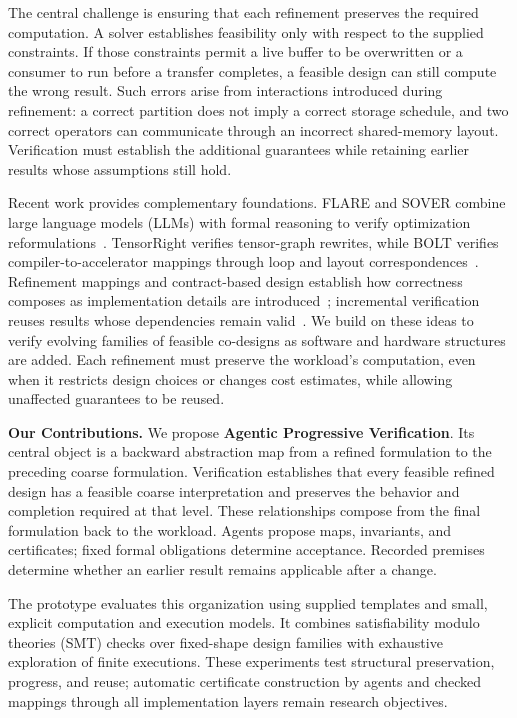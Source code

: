 \documentclass[11pt]{article}
\begin{document}
The central challenge is ensuring that each refinement preserves the required computation. A solver establishes feasibility only with respect to the supplied constraints. If those constraints permit a live buffer to be overwritten or a consumer to run before a transfer completes, a feasible design can still compute the wrong result. Such errors arise from interactions introduced during refinement: a correct partition does not imply a correct storage schedule, and two correct operators can communicate through an incorrect shared-memory layout. Verification must establish the additional guarantees while retaining earlier results whose assumptions still hold.

Recent work provides complementary foundations. FLARE and SOVER combine large language models (LLMs) with formal reasoning to verify optimization reformulations~\cite{flare,sover}. TensorRight verifies tensor-graph rewrites, while BOLT verifies compiler-to-accelerator mappings through loop and layout correspondences~\cite{tensorright,bolt}. Refinement mappings and contract-based design establish how correctness composes as implementation details are introduced~\cite{refinementmaps,contracts}; incremental verification reuses results whose dependencies remain valid~\cite{incremental}. We build on these ideas to verify evolving families of feasible co-designs as software and hardware structures are added. Each refinement must preserve the workload's computation, even when it restricts design choices or changes cost estimates, while allowing unaffected guarantees to be reused.

\textbf{Our Contributions.} We propose \textbf{Agentic Progressive Verification}. Its central object is a backward abstraction map from a refined formulation to the preceding coarse formulation. Verification establishes that every feasible refined design has a feasible coarse interpretation and preserves the behavior and completion required at that level. These relationships compose from the final formulation back to the workload. Agents propose maps, invariants, and certificates; fixed formal obligations determine acceptance. Recorded premises determine whether an earlier result remains applicable after a change.

The prototype evaluates this organization using supplied templates and small, explicit computation and execution models. It combines satisfiability modulo theories (SMT) checks over fixed-shape design families with exhaustive exploration of finite executions. These experiments test structural preservation, progress, and reuse; automatic certificate construction by agents and checked mappings through all implementation layers remain research objectives.
\end{document}
